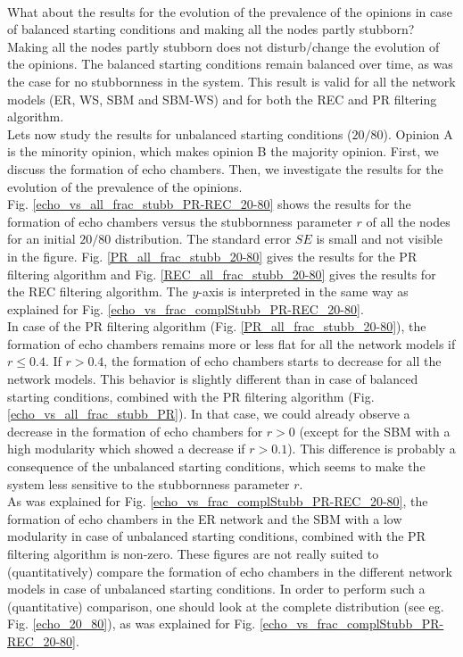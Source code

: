 \documentclass[11 pt , letterpaper , twoside , openright]{book}
\begin{document}
\\
\newline
What about the results for the evolution of the prevalence of the opinions in case of balanced starting conditions and making all the nodes partly stubborn? Making all the nodes partly stubborn does not disturb/change the evolution of the opinions. The balanced starting conditions remain balanced over time, as was the case for no stubbornness in the system. This result is valid for all the network models (ER, WS, SBM and SBM-WS) and for both the REC and PR filtering algorithm.\\
\newline
Lets now study the results for unbalanced starting conditions ($20/80$). Opinion A is the minority opinion, which makes opinion B the majority opinion. First, we discuss the formation of echo chambers. Then, we investigate the results for the evolution of the prevalence of the opinions.\\
\newline
Fig. \ref{echo_vs_all_frac_stubb_PR-REC_20-80} shows the results for the formation of echo chambers versus the stubbornness parameter $r$ of all the nodes for an initial $20/80$ distribution. The standard error $SE$ is small and not visible in the figure. Fig. \ref{PR_all_frac_stubb_20-80} gives the results for the PR filtering algorithm and Fig. \ref{REC_all_frac_stubb_20-80} gives the results for the REC filtering algorithm. The $y$-axis is interpreted in the same way as explained for Fig. \ref{echo_vs_frac_complStubb_PR-REC_20-80}.\\
\newline
In case of the PR filtering algorithm (Fig. \ref{PR_all_frac_stubb_20-80}), the formation of echo chambers remains more or less flat for all the network models if $r \leqslant 0.4$. If $r > 0.4$, the formation of echo chambers starts to decrease for all the network models. This behavior is slightly different than in case of balanced starting conditions, combined with the PR filtering algorithm (Fig. \ref{echo_vs_all_frac_stubb_PR}). In that case, we could already observe a decrease in the formation of echo chambers for $r > 0$ (except for the SBM with a high modularity which showed a decrease if $r>0.1$). This difference is probably a consequence of the unbalanced starting conditions, which seems to make the system less sensitive to the stubbornness parameter $r$.\\
\newline
As was explained for Fig. \ref{echo_vs_frac_complStubb_PR-REC_20-80}, the formation of echo chambers in the ER network and the SBM with a low modularity in case of unbalanced starting conditions, combined with the PR filtering algorithm is non-zero. These figures are not really suited to (quantitatively) compare the formation of echo chambers in the different network models in case of unbalanced starting conditions. In order to perform such a (quantitative) comparison, one should look at the complete distribution (see eg. Fig. \ref{echo_20_80}), as was explained for Fig. \ref{echo_vs_frac_complStubb_PR-REC_20-80}.
\end{document}
